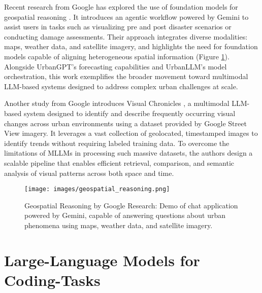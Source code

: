 Recent research from Google has explored the use of foundation models for geospatial reasoning \citep{2025GoogleGeospatialReasoning}. It introduces an agentic workflow powered by Gemini to assist users in tasks such as visualizing pre and post disaster scenarios or conducting damage assessments. Their approach integrates diverse modalities: maps, weather data, and satellite imagery, and highlights the need for foundation models capable of aligning heterogeneous spatial information (Figure \ref{fig:geospatial_reasoning}). Alongside UrbanGPT's forecasting capabilities and UrbanLLM's model orchestration, this work exemplifies the broader movement toward multimodal LLM-based systems designed to address complex urban challenges at scale.

Another study from Google introduces Visual Chronicles \citep{Deng2025VisualChronicles}, a multimodal LLM-based system designed to identify and describe frequently occurring visual changes across urban environments using a dataset provided by Google Street View imagery. It leverages a vast collection of geolocated, timestamped images to identify trends without requiring labeled training data. To overcome the limitations of MLLMs in processing such massive datasets, the authors design a scalable pipeline that enables efficient retrieval, comparison, and semantic analysis of visual patterns across both space and time.

\begin{figure}[hbtp]
  \centering
  \texttt{[image: images/geospatial\_reasoning.png]}
  \caption{Geospatial Reasoning by Google Research: Demo of chat application powered by Gemini, capable of answering questions about urban phenomena using maps, weather data, and satellite imagery.}
  \label{fig:geospatial_reasoning}
\end{figure}






\section{Large-Language Models for Coding-Tasks}


